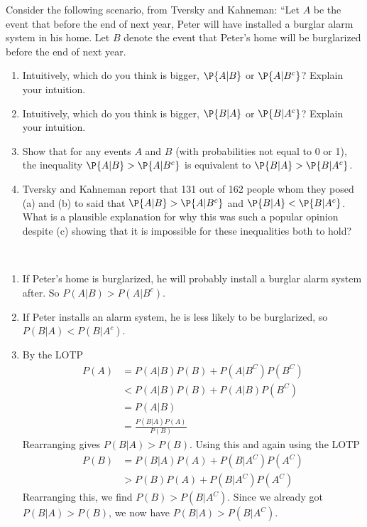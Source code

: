 

\setcounter{theorem}{9}
\begin{exercise}[BH.2.14]
Consider the following scenario, from Tversky and Kahneman: ``Let $A$ be the event that before the end of next year, Peter will have installed a burglar alarm system in his home. Let $B$ denote the event that Peter's home will be burglarized before the end of next year.
	\begin{enumerate}
		\item Intuitively, which do you think is bigger, $\P{A|B}$ or $\P{A|B^c}$? Explain your intuition.
		\item Intuitively, which do you think is bigger, $\P{B|A}$ or $\P{B|A^c}$? Explain your intuition.
		\item Show that for any events $A$ and $B$ (with probabilities not equal to 0 or 1), the inequality $\P{A|B} > \P{A|B^c}$ is equivalent to $\P{B|A} > \P{B|A^c}$.
		\item Tversky and Kahneman report that 131 out of 162 people whom they posed (a) and (b) to said that $\P{A|B} > \P{A|B^c}$ and $\P{B|A} < \P{B|A^c}$. What is a plausible explanation for why this was such a popular opinion despite (c) showing that it is impossible for these inequalities both to hold?
	\end{enumerate}
\begin{solution}~
	\begin{enumerate}
		\item If Peter's home is burglarized, he will probably install a burglar alarm system after. So $P(A|B)>P(A|B^{c})$.
		\item If Peter installs an alarm system, he is less likely to be burglarized, so $P(B|A)<P(B|A^{c})$. 
		\item By the LOTP
		\begin{align*}
			P(A)&= P(A|B)P(B)+P(A|B^{C})P(B^{C})\\
			&<P(A|B)P(B) + P(A|B)P(B^{C})\\
			&=P(A|B) \\&= \frac{P(B|A)P(A)}{P(B)}
		\end{align*}
		Rearranging gives $P(B|A)>P(B)$. 
		Using this and again using the LOTP
		\begin{align*}
			P(B) &= P(B|A)P(A) + P(B|A^{C})P(A^{C}) \\
			&>P(B)P(A)+P(B|A^{C})P(A^{C})
		\end{align*}
		Rearranging this, we find $P(B)>P(B|A^{C})$. Since we already got $P(B|A)>P(B)$, we now have $P(B|A)>P(B|A^{C})$.


\end{enumerate}
\end{solution}
\end{exercise}

